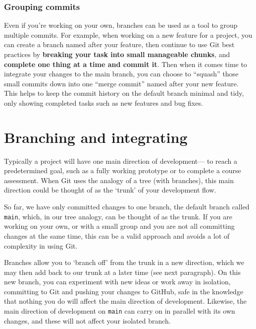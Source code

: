 \documentclass[
  letterpaper,
  DIV=11,
  numbers=noendperiod]{scrartcl}
\begin{document}
\hypertarget{grouping-commits}{%
\subsubsection{Grouping commits}\label{grouping-commits}}

Even if you're working on your own, branches can be used as a tool to
group multiple commits. For example, when working on a new feature for a
project, you can create a branch named after your feature, then continue
to use Git best practices by \textbf{breaking your task into small
manageable chunks}, and \textbf{complete one thing at a time and commit
it}. Then when it comes time to integrate your changes to the main
branch, you can choose to ``squash'' those small commits down into one
``merge commit'' named after your new feature. This helps to keep the
commit history on the default branch minimal and tidy, only showing
completed tasks such as new features and bug fixes.

\hypertarget{branching-and-integrating}{%
\section{Branching and integrating}\label{branching-and-integrating}}

Typically a project will have one main direction of development--- to
reach a predetermined goal, such as a fully working prototype or to
complete a course assessment. When Git uses the analogy of a tree (with
branches), this main direction could be thought of as the `trunk' of
your development flow.

So far, we have only committed changes to one branch, the default branch
called \texttt{main}, which, in our tree analogy, can be thought of as
the trunk. If you are working on your own, or with a small group and you
are not all committing changes at the same time, this can be a valid
approach and avoids a lot of complexity in using Git.

Branches allow you to `branch off' from the trunk in a new direction,
which we may then add back to our trunk at a later time (see next
paragraph). On this new branch, you can experiment with new ideas or
work away in isolation, committing to Git and pushing your changes to
GitHub, safe in the knowledge that nothing you do will affect the main
direction of development. Likewise, the main direction of development on
\texttt{main} can carry on in parallel with its own changes, and these
will not affect your isolated branch.
\end{document}
